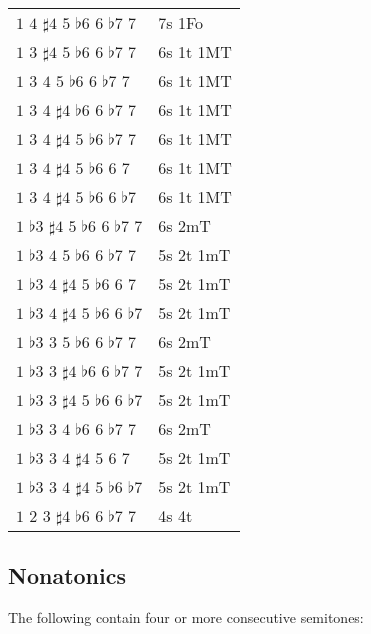 \documentclass[english]{./gbook}
\begin{document}
\begin{large}
\begin{tabular}{ll}
    $1$ $4$ $\sharp4$ $5$ $\flat6$ $6$ $\flat7$ $7$   &   7s 1Fo      \\
    $1$ $3$ $\sharp4$ $5$ $\flat6$ $6$ $\flat7$ $7$   &   6s 1t 1MT      \\
    $1$ $3$ $4$ $5$ $\flat6$ $6$ $\flat7$ $7$   &   6s 1t 1MT      \\
    $1$ $3$ $4$ $\sharp4$ $\flat6$ $6$ $\flat7$ $7$   &   6s 1t 1MT      \\
    $1$ $3$ $4$ $\sharp4$ $5$ $\flat6$ $\flat7$ $7$   &   6s 1t 1MT      \\
    $1$ $3$ $4$ $\sharp4$ $5$ $\flat6$ $6$ $7$   &   6s 1t 1MT      \\
    $1$ $3$ $4$ $\sharp4$ $5$ $\flat6$ $6$ $\flat7$   &   6s 1t 1MT      \\
    $1$ $\flat3$ $\sharp4$ $5$ $\flat6$ $6$ $\flat7$ $7$   &   6s 2mT      \\
    $1$ $\flat3$ $4$ $5$ $\flat6$ $6$ $\flat7$ $7$   &   5s 2t 1mT      \\
    $1$ $\flat3$ $4$ $\sharp4$ $5$ $\flat6$ $6$ $7$   &   5s 2t 1mT      \\
    $1$ $\flat3$ $4$ $\sharp4$ $5$ $\flat6$ $6$ $\flat7$   &   5s 2t 1mT      \\
    $1$ $\flat3$ $3$ $5$ $\flat6$ $6$ $\flat7$ $7$   &   6s 2mT      \\
    $1$ $\flat3$ $3$ $\sharp4$ $\flat6$ $6$ $\flat7$ $7$   &   5s 2t 1mT      \\
    $1$ $\flat3$ $3$ $\sharp4$ $5$ $\flat6$ $6$ $\flat7$   &   5s 2t 1mT      \\
    $1$ $\flat3$ $3$ $4$ $\flat6$ $6$ $\flat7$ $7$   &   6s 2mT      \\
    $1$ $\flat3$ $3$ $4$ $\sharp4$ $5$ $6$ $7$   &   5s 2t 1mT      \\
    $1$ $\flat3$ $3$ $4$ $\sharp4$ $5$ $\flat6$ $\flat7$   &   5s 2t 1mT      \\
    $1$ $2$ $3$ $\sharp4$ $\flat6$ $6$ $\flat7$ $7$   &   4s 4t      
\end{tabular}

\subsection*{Nonatonics}

The following contain four or more consecutive semitones:


\end{large}
\end{document}
